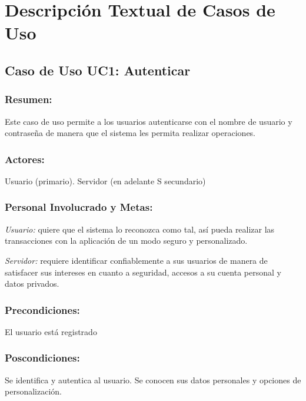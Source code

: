 \section{Descripción Textual de Casos de Uso}


\subsection{Caso de Uso UC1: Autenticar}

\begin{framed}


\subsubsection{Resumen:} Este caso de uso permite a los usuarios autenticarse con el nombre de usuario y contraseña de manera que el sistema les permita realizar operaciones.


\subsubsection{Actores:} Usuario (primario). Servidor (en adelante S secundario)

\subsubsection{Personal Involucrado y Metas:}

\emph{Usuario:} quiere que el sistema lo reconozca como tal, así pueda realizar las transacciones con la aplicación de un modo seguro y personalizado.

\emph{Servidor:} requiere identificar confiablemente a sus usuarios de manera de satisfacer sus intereses en cuanto a seguridad, accesos a su cuenta personal y datos privados. 

\subsubsection{Precondiciones:} 
El usuario está registrado 

\subsubsection{Poscondiciones:} 
Se identifica y autentica al usuario. Se conocen sus datos personales y opciones de personalización.


\end{framed}
